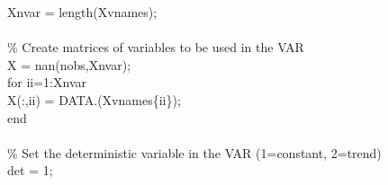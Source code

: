 \hspace{1mm}\hspace{5mm} \hspace{5mm} Xnvar        = length(Xvnames); \\ 
\hspace{1mm}\hspace{5mm} \hspace{5mm}  \\ 
\hspace{1mm}\hspace{5mm} \hspace{5mm} \textcolor{matlabgreen}{\% Create matrices of variables to be used in the VAR }\\ 
\hspace{1mm}\hspace{5mm} \hspace{5mm} X = nan(nobs,Xnvar); \\ 
\hspace{1mm}\hspace{5mm} \hspace{5mm} \textcolor{matlabblue}{for} ii=1:Xnvar \\ 
\hspace{1mm}\hspace{5mm} \hspace{5mm} \hspace{5mm} X(:,ii) = DATA.(Xvnames\{ii\}); \\ 
\hspace{1mm}\hspace{5mm} \hspace{5mm} \textcolor{matlabblue}{end} \\ 
\hspace{1mm}\hspace{5mm} \hspace{5mm}  \\ 
\hspace{1mm}\hspace{5mm} \hspace{5mm} \textcolor{matlabgreen}{\% Set the deterministic variable in the VAR (1=constant, 2=trend) }\\ 
\hspace{1mm}\hspace{5mm} \hspace{5mm} det = 1; \\ 
\hspace{1mm}\hspace{5mm} \hspace{5mm}  \\ 
